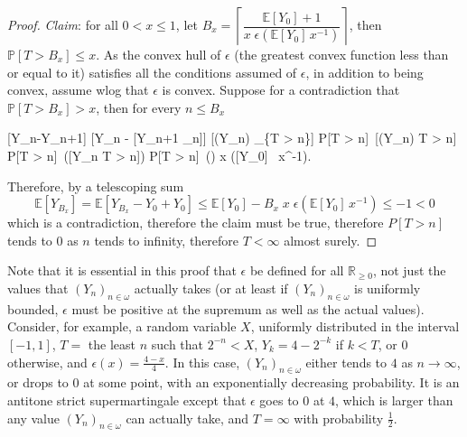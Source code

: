 \documentclass{article}
\newcommand\expect[1]{\mathbb{E}[#1]}
\newcommand\set[1]{\{#1\}}
\newcommand\calF{\mathcal{F}}
\theoremstyle{definition}
\theoremstyle{lemma}
\theoremstyle{remark}
\begin{document}
\begin{proof}
\emph{Claim}: for all $0 < x \leq 1$, let $B_x = \left \lceil \dfrac{\expect{Y_0}+1}{x \; \epsilon(\expect{Y_0} \, x^{-1})} \right \rceil$, then
\(
\mathbb P[T > B_x] \leq x.
\)
As the convex hull of $\epsilon$ (the greatest convex function less than or equal to it) satisfies all the conditions assumed of $\epsilon$, in addition to being convex, assume wlog that $\epsilon$ is convex.
Suppose for a contradiction that $\mathbb P[T > B_x] > x$, then for every $n \leq B_x$
\begin{calculation}
\expect{Y_n-Y_{n+1}}
\expect{Y_n - \expect{Y_{n+1} \mid \calF_n}}
\expect{\epsilon(Y_n) _{\set{T > n}}}
\mathbb P[T > n]\ \expect{\epsilon(Y_n) \mid T > n}
\mathbb P[T > n]\ \epsilon(\expect{Y_n \mid T > n})
\mathbb P[T > n]\ \epsilon\Big(\dfrac{\expect{Y_0}}{\mathbb P[T > n]}\Big)
x \; \epsilon\big(\expect{Y_0} \, x^{-1}\big).
\end{calculation}
Therefore, by a telescoping sum
\[
\expect{Y_{B_x}} = \expect{Y_{B_x}-Y_0+Y_0} \leq \expect{Y_0} - B_x \; x \; \epsilon(\expect{Y_0} \, x^{-1}) \leq -1 < 0 
\]
which is a contradiction, therefore the claim must be true, therefore $P[T > n]$ tends to 0 as $n$ tends to infinity, therefore $T < \infty$ almost surely.
\end{proof}

Note that it is essential in this proof that $\epsilon$ be defined for all $\mathbb R_{\geq 0}$, not just the values that $(Y_n)_{n \in \omega}$ actually takes (or at least if $(Y_n)_{n \in \omega}$ is uniformly bounded, $\epsilon$ must be positive at the supremum as well as the actual values). Consider, for example, a random variable $X$, uniformly distributed in the interval $[-1,1]$, $T = $ the least $n$ such that $2^{-n} < X$, $Y_k = 4-2^{-k}$ if $k < T$, or $0$ otherwise, and $\epsilon(x) = \frac{4-x}{4}$. In this case, $(Y_n)_{n \in \omega}$ either tends to $4$ as $n \to \infty$, or drops to 0 at some point, with an exponentially decreasing probability. It is an antitone strict supermartingale except that $\epsilon$ goes to $0$ at $4$, which is larger than any value $(Y_n)_{n \in \omega}$ can actually take, and $T = \infty$ with probability $\frac 1 2$.
\end{document}
